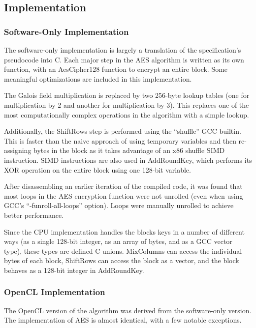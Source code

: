\documentclass[a4paper,10pt]{article}
\begin{document}
\subsection{Implementation}

\subsubsection{Software-Only Implementation}

The software-only implementation is largely a translation of the specification's pseudocode into C.  Each major step in the AES algorithm is written as its own function, with an AesCipher128 function to encrypt an entire block.  Some meaningful optimizations are included in this implementation.

The Galois field multiplication is replaced by two 256-byte lookup tables (one for multiplication by 2 and another for multiplication by 3). This replaces one of the most computationally complex operations in the algorithm with a simple lookup.

Additionally, the ShiftRows step is performed using the ``shuffle'' GCC builtin.  This is faster than the naive approach of using temporary variables and then re-assigning bytes in the block as it takes advantage of an x86 shuffle SIMD instruction.  SIMD instructions are also used in AddRoundKey, which performs its XOR operation on the entire block using one 128-bit variable.

After disassembling an earlier iteration of the compiled code, it was found that most loops in the AES encryption function were not unrolled (even when using GCC's ``-funroll-all-loops'' option).  Loops were manually unrolled to achieve better performance.

Since the CPU implementation handles the blocks keys in a number of different ways (as a single 128-bit integer, as an array of bytes, and as a GCC vector type), these types are defined C unions. MixColumns can access the individual bytes of each block, ShiftRows can access the block as a vector, and the block behaves as a 128-bit integer in AddRoundKey.

\subsubsection{OpenCL Implementation}

The OpenCL version of the algorithm was derived from the software-only version.  The implementation of AES is almost identical, with a few notable exceptions.
\end{document}
